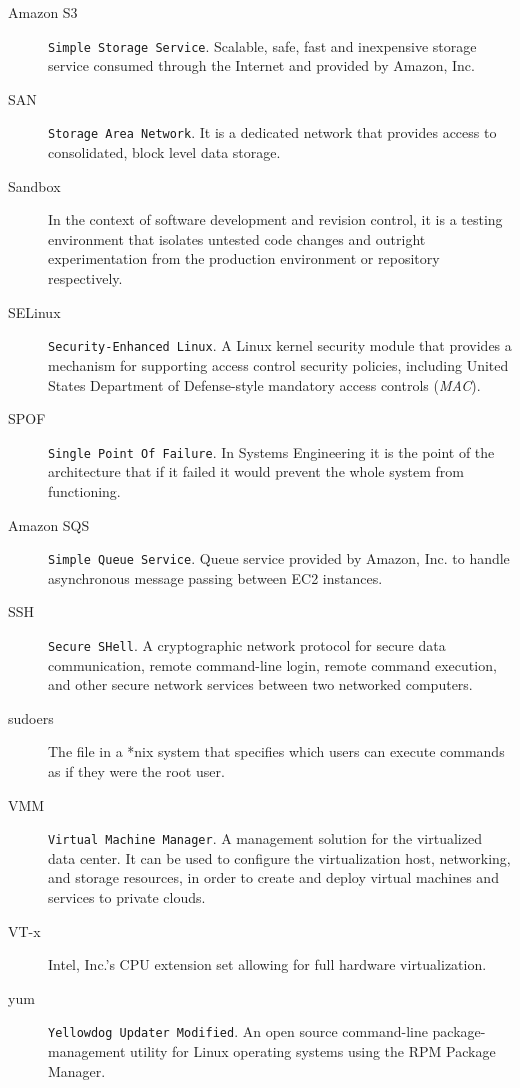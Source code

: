 \begin{description}
\item[Amazon S3] \texttt{Simple Storage Service}. Scalable, safe, fast and inexpensive storage service consumed through the Internet and provided by Amazon, Inc.
\item[SAN] \texttt{Storage Area Network}. It is a dedicated network that provides access to consolidated, block level data storage.
\item[Sandbox] In the context of software development and revision control, it is a testing environment that isolates untested code changes and outright experimentation from the production environment or repository respectively.
\item[SELinux] \texttt{Security-Enhanced Linux}. A Linux kernel security module that provides a mechanism for supporting access control security policies, including United States Department of Defense-style mandatory access controls (\emph{MAC}).
\item[SPOF] \texttt{Single Point Of Failure}. In Systems Engineering it is the point of the architecture that if it failed it would prevent the whole system from functioning.
\item[Amazon SQS] \texttt{Simple Queue Service}. Queue service provided by Amazon, Inc. to handle asynchronous message passing between EC2 instances.
\item[SSH] \texttt{Secure SHell}. A cryptographic network protocol for secure data communication, remote command-line login, remote command execution, and other secure network services between two networked computers.
\item[sudoers] The file in a *nix system that specifies which users can execute commands as if they were the root user.
\item[VMM] \texttt{Virtual Machine Manager}. A management solution for the virtualized data center. It can be used to configure the virtualization host, networking, and storage resources, in order to create and deploy virtual machines and services to private clouds.
\item[VT-x] Intel, Inc.'s CPU extension set allowing for full hardware virtualization.
\item[yum] \texttt{Yellowdog Updater Modified}. An open source command-line package-management utility for Linux operating systems using the RPM Package Manager.
\end{description}

